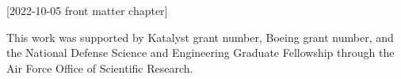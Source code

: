 [2022-10-05 front matter chapter]
%
%
%
%
%
%

%
%
%
\begin{statement}
\end{statement}




\begin{acknowledgments}
  This work was supported by Katalyst grant number, Boeing grant number, and the National Defense Science and Engineering Graduate Fellowship through the Air Force Office of Scientific Research.
\end{acknowledgments}



